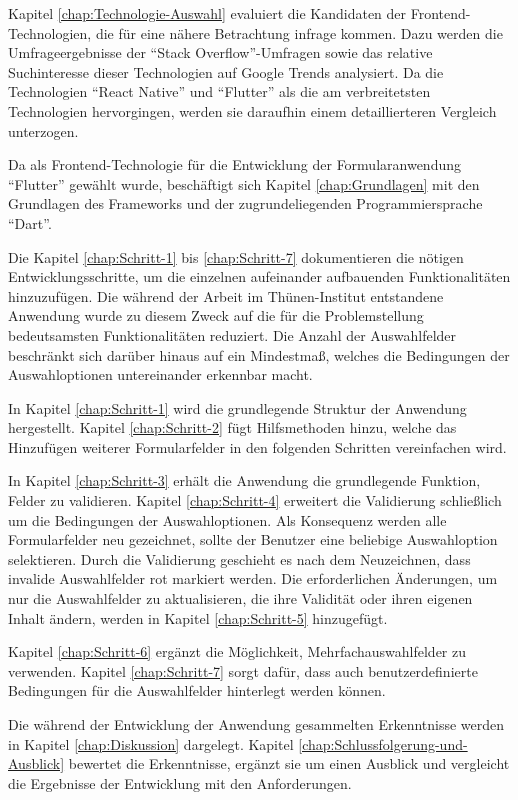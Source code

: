

Kapitel \ref{chap:Technologie-Auswahl} evaluiert die Kandidaten der Frontend-Technologien,
die für eine nähere Betrachtung infrage kommen.
Dazu werden die Umfrageergebnisse der \enquote{Stack Overflow}-Umfragen sowie das relative Suchinteresse dieser Technologien auf Google Trends analysiert.
Da die Technologien \enquote{React Native} und  \enquote{Flutter} als die am verbreitetsten Technologien hervorgingen,
werden sie daraufhin einem detaillierteren Vergleich unterzogen.

Da als Frontend-Technologie für die Entwicklung der Formularanwendung \enquote{Flutter} gewählt wurde,
beschäftigt sich Kapitel \ref{chap:Grundlagen} mit den Grundlagen des Frameworks und der zugrundeliegenden Programmiersprache \enquote{Dart}.

Die Kapitel \ref{chap:Schritt-1} bis \ref{chap:Schritt-7} dokumentieren die nötigen Entwicklungsschritte,
um die einzelnen aufeinander aufbauenden  Funktionalitäten hinzuzufügen.
Die während der Arbeit im Thünen-Institut entstandene Anwendung wurde zu diesem Zweck auf die für die  Problemstellung bedeutsamsten Funktionalitäten reduziert.
Die Anzahl der Auswahlfelder beschränkt sich darüber hinaus auf ein Mindestmaß,
welches die Bedingungen der Auswahloptionen untereinander erkennbar macht. 

In Kapitel \ref{chap:Schritt-1} wird die grundlegende Struktur der Anwendung hergestellt.
Kapitel \ref{chap:Schritt-2} fügt Hilfsmethoden hinzu,
welche  das Hinzufügen  weiterer Formularfelder  in den folgenden Schritten vereinfachen wird.

In Kapitel \ref{chap:Schritt-3} erhält die Anwendung die grundlegende Funktion,
Felder zu validieren.
Kapitel \ref{chap:Schritt-4} erweitert die Validierung schließlich um die Bedingungen der Auswahloptionen.
Als Konsequenz werden alle Formularfelder neu gezeichnet,
sollte  der Benutzer eine beliebige Auswahloption selektieren.
Durch die Validierung  geschieht es nach dem Neuzeichnen,
dass invalide Auswahlfelder rot markiert werden.
Die erforderlichen Änderungen,
um nur die Auswahlfelder zu aktualisieren,
die ihre Validität oder ihren eigenen Inhalt ändern,
werden in Kapitel \ref{chap:Schritt-5} hinzugefügt.

Kapitel \ref{chap:Schritt-6} ergänzt die Möglichkeit,
Mehrfachauswahlfelder zu verwenden.
Kapitel \ref{chap:Schritt-7} sorgt dafür,
dass auch benutzerdefinierte Bedingungen für die Auswahlfelder hinterlegt werden können.

Die während der Entwicklung der Anwendung gesammelten Erkenntnisse werden in Kapitel \ref{chap:Diskussion} dargelegt.
Kapitel \ref{chap:Schlussfolgerung-und-Ausblick} bewertet die Erkenntnisse,
ergänzt sie um einen Ausblick und vergleicht die Ergebnisse der Entwicklung mit den Anforderungen.
